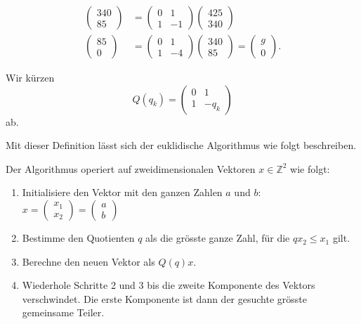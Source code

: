 \begin{align*}
\\
\begin{pmatrix} 340 \\ 85 \end{pmatrix}
&=
\begin{pmatrix} 0&1\\1&-1 \end{pmatrix}
\begin{pmatrix} 425 \\ 340 \end{pmatrix}
\\
\begin{pmatrix} 85 \\ 0 \end{pmatrix}
&=
\begin{pmatrix} 0&1\\1&-4 \end{pmatrix}
\begin{pmatrix} 340 \\ 85 \end{pmatrix}
=
\begin{pmatrix}g\\0\end{pmatrix}.
\end{align*}

\begin{definition}
Wir kürzen
\[
Q(q_k) = \begin{pmatrix} 0 & 1 \\ 1 & -q_k \end{pmatrix}
\]
ab.
\end{definition}

Mit dieser Definition lässt sich der euklidische Algorithmus wie folgt
beschreiben.

\begin{algorithmus}[Euklid]
\label{lifting:euklid}
Der Algorithmus operiert auf zweidimensionalen Vektoren
$x\in\mathbb Z^2$ 
wie folgt:
\begin{enumerate}
\item Initialisiere  den Vektor mit den ganzen Zahlen $a$ und $b$:
$\displaystyle x = \begin{pmatrix}x_1\\x_2\end{pmatrix}=\begin{pmatrix}a\\b\end{pmatrix}$
\item Bestimme den Quotienten $q$ als die grösste ganze Zahl,
für die $qx_2\le x_1$ gilt.
\item Berechne den neuen Vektor als $Q(q)x$.
\item Wiederhole Schritte 2 und 3 bis die zweite Komponente des Vektors
verschwindet.
Die erste Komponente ist dann der gesuchte grösste gemeinsame Teiler.
\end{enumerate}
\end{algorithmus}


